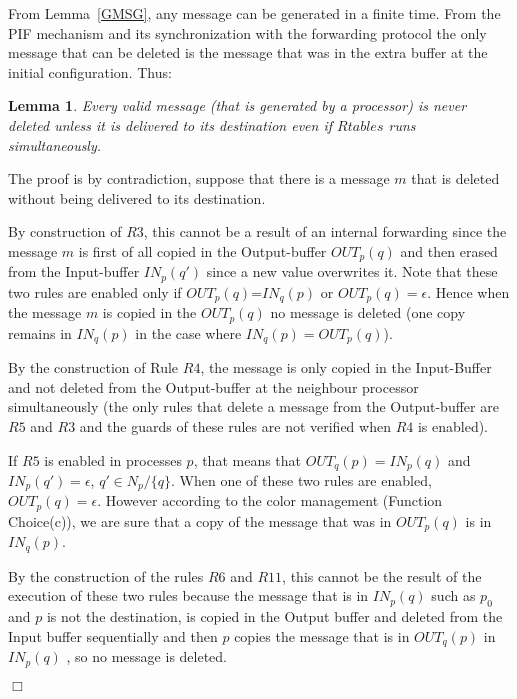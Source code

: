 \documentclass{llncs}
\renewenvironment{proof}{{\it Proof. } }{{\hfill $\Box$}\vspace{.5pc}}
\newtheorem{lem}{Lemma}
\begin{document}
 From Lemma~\ref{GMSG}, any message can be generated in a finite time.  
 From the PIF mechanism and its synchronization with the forwarding protocol the only message that can be deleted is
the message that was in the extra buffer at the initial configuration.  Thus:



\begin{lem}\label{KeepMSG}
Every valid message (that is generated by a processor) is never deleted unless it is delivered to its destination even
if $Rtables$  runs simultaneously.
\end{lem}  

\begin{proof}
The proof is by contradiction, suppose that there is a message $m$ that is deleted without being delivered to its destination. 


By construction of $R3$, this cannot be a result of an internal forwarding since the message $m$ is first of all copied in the Output-buffer $OUT_{p}(q)$ and then erased from the Input-buffer $IN_{p}(q')$ since a new value overwrites it. Note that these two rules are enabled only if $OUT_{p}(q)$=$IN_{q}(p)$ or $OUT_{p}(q)=\epsilon$. Hence when the message $m$ is copied in the $OUT_{p}(q)$ no message is deleted (one copy remains in $IN_{q}(p)$ in the case where $IN_{q}(p)=OUT_{p}(q)$). 

By the construction of Rule $R4$,  the message is only copied in the Input-Buffer and not deleted from the Output-buffer at the neighbour processor simultaneously (the only rules that delete a message from the Output-buffer are $R5$ and $R3$ and the guards of these rules are not verified when $R4$ is enabled).

If $R5$ is enabled in processes $p$, that means that $OUT_{q}(p)=IN_{p}(q)$ and $IN_{p}(q')=\epsilon$, $q'\in N_{p}/\{q\}$. When one of these two rules are enabled, $OUT_{p}(q)=\epsilon$. However according to the color management (Function Choice(c)),  we are sure that a copy of the message that was in $OUT_{p}(q)$ is in $IN_{q}(p)$. 

By the construction of the rules $R6$ and $R11$, this cannot be the result of the execution of these two rules because the message that is in $IN_{p}(q)$ such as $p_0$ and $p$ is not the destination, is copied in the Output buffer and deleted from the Input buffer sequentially and then $p$ copies the message that is in $OUT_{q}(p)$ in $IN_{p}(q)$ , so no message is deleted.


\end{proof}
\end{document}
